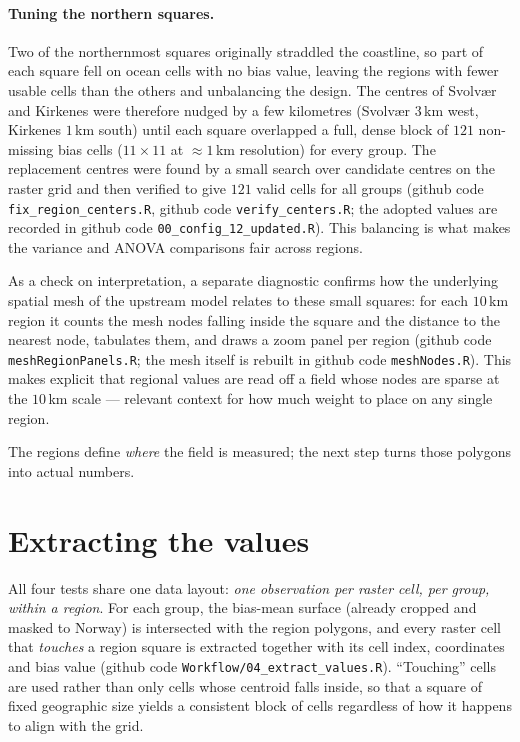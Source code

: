 \paragraph{Tuning the northern squares.}
Two of the northernmost squares originally straddled the coastline, so part
of each square fell on ocean cells with no bias value, leaving the regions
with fewer usable cells than the others and unbalancing the design. The
centres of Svolvær and Kirkenes were therefore nudged by a few kilometres
(Svolvær $3$\,km west, Kirkenes $1$\,km south) until each square overlapped
a full, dense block of $121$ non-missing bias cells ($11\times11$ at
$\approx 1$\,km resolution) for every group. The replacement centres were
found by a small search over candidate centres on the raster grid and then
verified to give $121$ valid cells for all groups (github code
\texttt{fix\_region\_centers.R}, github code \texttt{verify\_centers.R}; the
adopted values are recorded in github code \texttt{00\_config\_12\_updated.R}).
This balancing is what makes the variance and ANOVA comparisons fair across
regions.

As a check on interpretation, a separate diagnostic confirms how the
underlying spatial mesh of the upstream model relates to these small
squares: for each $10$\,km region it counts the mesh nodes falling inside
the square and the distance to the nearest node, tabulates them, and draws
a zoom panel per region (github code \texttt{meshRegionPanels.R}; the mesh
itself is rebuilt in github code \texttt{meshNodes.R}). This makes explicit
that regional values are read off a field whose nodes are sparse at the
$10$\,km scale --- relevant context for how much weight to place on any
single region.

The regions define \emph{where} the field is measured; the next step turns
those polygons into actual numbers.

\section{Extracting the values}
\label{sec:extract}

All four tests share one data layout: \emph{one observation per raster
cell, per group, within a region}. For each group, the bias-mean surface
(already cropped and masked to Norway) is intersected with the region
polygons, and every raster cell that \emph{touches} a region square is
extracted together with its cell index, coordinates and bias value (github
code \texttt{Workflow/04\_extract\_values.R}). ``Touching'' cells are used
rather than only cells whose centroid falls inside, so that a square of
fixed geographic size yields a consistent block of cells regardless of how
it happens to align with the grid.

